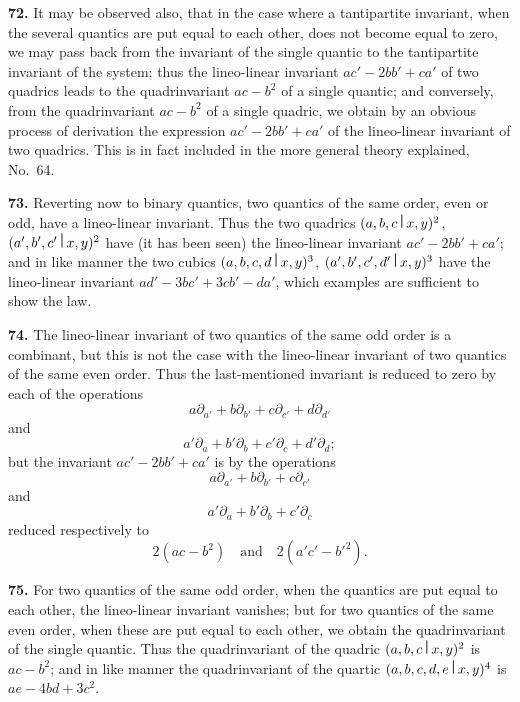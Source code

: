 \documentclass[12pt,a4paper]{article}
\theoremstyle{definition}
\begin{document}
\medskip
\noindent\textbf{72.} It may be observed also, that in the case where a tantipartite invariant, when the several quantics are put equal to each other, does not become equal to zero, we may pass back from the invariant of the single quantic to the tantipartite invariant of the system; thus the lineo-linear invariant $ac'-2bb'+ca'$ of two quadrics leads to the quadrinvariant $ac-b^2$ of a single quantic; and conversely, from the quadrinvariant $ac-b^2$ of a single quadric, we obtain by an obvious process of derivation the expression $ac'-2bb'+ca'$ of the lineo-linear invariant of two quadrics. This is in fact included in the more general theory explained, No.~64.

\newpage

\medskip
\noindent\textbf{73.} Reverting now to binary quantics, two quantics of the same order, even or odd, have a lineo-linear invariant. Thus the two quadrics $(a,b,c\,\raisebox{0.5ex}{\textbf{\textbar}}\,x,y)^2$, $(a',b',c'\,\raisebox{0.5ex}{\textbf{\textbar}}\,x,y)^2$ have (it has been seen) the lineo-linear invariant $ac'-2bb'+ca'$; and in like manner the two cubics $(a,b,c,d\,\raisebox{0.5ex}{\textbf{\textbar}}\,x,y)^3$, $(a',b',c',d'\,\raisebox{0.5ex}{\textbf{\textbar}}\,x,y)^3$ have the lineo-linear invariant $ad'-3bc'+3cb'-da'$, which examples are sufficient to show the law.

\medskip
\noindent\textbf{74.} The lineo-linear invariant of two quantics of the same odd order is a combinant, but this is not the case with the lineo-linear invariant of two quantics of the same even order. Thus the last-mentioned invariant is reduced to zero by each of the operations
\[a\partial_{a'} + b\partial_{b'} + c\partial_{c'} + d\partial_{d'}\]
and
\[a'\partial_a + b'\partial_b + c'\partial_c + d'\partial_d;\]
but the invariant $ac'-2bb'+ca'$ is by the operations
\[a\partial_{a'} + b\partial_{b'} + c\partial_{c'}\]
and
\[a'\partial_a + b'\partial_b + c'\partial_c\]
reduced respectively to
\[2(ac-b^2)\quad \text{and} \quad 2(a'c'-b'^2).\]

\medskip
\noindent\textbf{75.} For two quantics of the same odd order, when the quantics are put equal to each other, the lineo-linear invariant vanishes; but for two quantics of the same even order, when these are put equal to each other, we obtain the quadrinvariant of the single quantic. Thus the quadrinvariant of the quadric $(a,b,c\,\raisebox{0.5ex}{\textbf{\textbar}}\,x,y)^2$ is $ac-b^2$; and in like manner the quadrinvariant of the quartic $(a,b,c,d,e\,\raisebox{0.5ex}{\textbf{\textbar}}\,x,y)^4$ is $ae-4bd+3c^2$.
\end{document}

